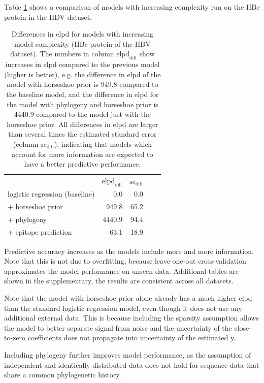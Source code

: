 \documentclass[fleqn,11pt]{SelfArx} %
\begin{document}
Table \ref{loo} shows a comparison of models with increasing complexity run on the HBe protein in the HDV dataset.

\begin{table}[h!]
  \renewcommand{\arraystretch}{1.3}
  \centering
  \caption{Differences in elpd for models with increasing model complexity (HBe protein of the HBV dataset).
  The numbers in column \(\text{elpd}_\text{diff}\) show increases in elpd compared to the previous model (higher is better), e.g. the difference in elpd of the model with horseshoe prior is 949.8 compared to the baseline model, and the difference in elpd for the model with phylogeny and horseshoe prior is 4440.9 compared to the model just with the horseshoe prior. All differences in elpd are larger than several times the estimated standard error (column \(\text{se}_\text{diff}\)), indicating that models which account for more information are expected to have a better predictive performance.}
  \vspace{0.5cm}
  \begin{tabular}{l|r|rll}
  \multicolumn{1}{l|}{} & \multicolumn{1}{c|}{\(\text{elpd}_\text{diff}\)} & \multicolumn{1}{c}{\(\text{se}_\text{diff}\)} &  &  \\ \cline{1-3}
  logistic regression (baseline) & 0.0  & 0.0 &  &  \\
  + horseshoe prior     & 949.8  & 65.2 &  &  \\
  + phylogeny & 4440.9 & 94.4 &  &  \\
  + epitope prediction & 63.1   & 18.9 &  & 
  \end{tabular}
  \label{loo}
\end{table}

Predictive accuracy increases as the models include more and more information.
Note that this is not due to overfitting, because leave-one-out cross-validation approximates the model performance on unseen data. Additional tables are shown in the supplementary, the results are consistent across all datasets.

Note that the model with horseshoe prior alone already has a much higher elpd than the standard logistic regression model, even though it does not use any additional external data. This is because including the sparsity assumption allows the model to better separate signal from noise and the uncertainty of the close-to-zero coefficients does not propagate into uncertainty of the estimated y.

Including phylogeny further improves model performance, as the assumption of independent and identically distributed data does not hold for sequence data that share a common phylogenetic history.
\end{document}
